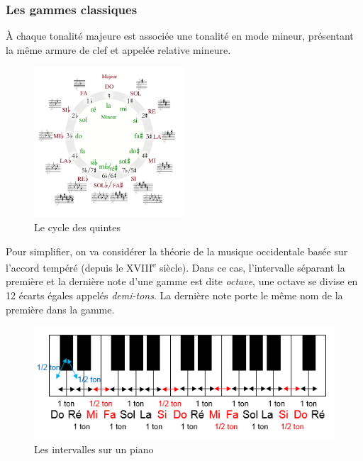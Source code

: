 \documentclass[french,]{article}
\begin{document}
\hypertarget{les-gammes-classiques}{%
\subsubsection{Les gammes classiques}\label{les-gammes-classiques}}

À chaque tonalité majeure est associée une tonalité en mode mineur,
présentant la même armure de clef et appelée relative mineure.

\begin{figure}
\centering
\includegraphics[width=0.5\textwidth,height=\textheight]{img/cycle-des-quintes.png}
\caption{Le cycle des quintes}
\end{figure}

Pour simplifier, on va considérer la théorie de la musique occidentale
basée sur l'accord tempéré (depuis le XVIII\textsuperscript{e} siècle).
Dans ce cas, l'intervalle séparant la première et la dernière note d'une
gamme est dite \emph{octave}, une octave se divise en 12 écarts égales
appelés \emph{demi-tons}. La dernière note porte le même nom de la
première dans la gamme.

\begin{figure}
\centering
\includegraphics[width=1\textwidth,height=\textheight]{img/intervalles-piano.png}
\caption{Les intervalles sur un piano}
\end{figure}
\end{document}
